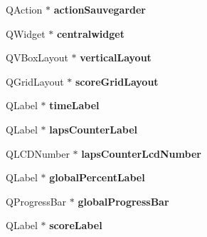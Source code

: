 \begin{DoxyCompactItemize}
\item 
\hypertarget{class_ui___game_aac058b7934b319324715b339e2fee9d4}{Q\-Action $\ast$ {\bfseries action\-Sauvegarder}}\label{class_ui___game_aac058b7934b319324715b339e2fee9d4}

\item 
\hypertarget{class_ui___game_a869379b5f898f02db00e5cbf75acec63}{Q\-Widget $\ast$ {\bfseries centralwidget}}\label{class_ui___game_a869379b5f898f02db00e5cbf75acec63}

\item 
\hypertarget{class_ui___game_a46781d24624f5b866bfd766bf396f275}{Q\-V\-Box\-Layout $\ast$ {\bfseries vertical\-Layout}}\label{class_ui___game_a46781d24624f5b866bfd766bf396f275}

\item 
\hypertarget{class_ui___game_abf6cd4cd75a871fef241c88d673286f9}{Q\-Grid\-Layout $\ast$ {\bfseries score\-Grid\-Layout}}\label{class_ui___game_abf6cd4cd75a871fef241c88d673286f9}

\item 
\hypertarget{class_ui___game_ad79388f7aefbab94c85c9b2e78164f27}{Q\-Label $\ast$ {\bfseries time\-Label}}\label{class_ui___game_ad79388f7aefbab94c85c9b2e78164f27}

\item 
\hypertarget{class_ui___game_aa6abf62c95fbece249270011baec534b}{Q\-Label $\ast$ {\bfseries laps\-Counter\-Label}}\label{class_ui___game_aa6abf62c95fbece249270011baec534b}

\item 
\hypertarget{class_ui___game_a658aa90f1eac60dfdaa16b43b58c436c}{Q\-L\-C\-D\-Number $\ast$ {\bfseries laps\-Counter\-Lcd\-Number}}\label{class_ui___game_a658aa90f1eac60dfdaa16b43b58c436c}

\item 
\hypertarget{class_ui___game_aee97b8707056ef49edfdd50c698abbe8}{Q\-Label $\ast$ {\bfseries global\-Percent\-Label}}\label{class_ui___game_aee97b8707056ef49edfdd50c698abbe8}

\item 
\hypertarget{class_ui___game_a6278ed39fafc8fcf0a6c294885ee3832}{Q\-Progress\-Bar $\ast$ {\bfseries global\-Progress\-Bar}}\label{class_ui___game_a6278ed39fafc8fcf0a6c294885ee3832}

\item 
\hypertarget{class_ui___game_a589ec84806c647aab1e2daa331c2ae85}{Q\-Label $\ast$ {\bfseries score\-Label}}\label{class_ui___game_a589ec84806c647aab1e2daa331c2ae85}


\end{DoxyCompactItemize}
